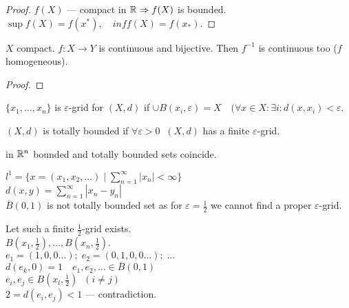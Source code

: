 \begin{proof}
  $f(X)$ --- compact in $\mathbb{R} \Rightarrow f(X)$ is bounded.\\
$\sup f(X) = f(x^{*}), \quad inf f(X) = f(x_{*})$.
\end{proof}

\begin{corollary}
  $X$ compact. $f:X \to Y$ is continuous and bijective. Then
  $f^{-1}$ is continuous too ($f$ homogeneous).
\end{corollary}

\begin{proof}

\end{proof}

\begin{definition}
 $\{x_1,\ldots,x_n\} $ is $\varepsilon$-grid for $(X,d)$ if $ \cup B(x_{i}, \varepsilon) = X \quad (\forall x\in X : \exists i :d(x,x_{i}) < \varepsilon$.
\end{definition}

\begin{definition}
  $(X,d)$ is totally bounded if $\forall \varepsilon>0 \;\; (X,d)$ has a finite $\varepsilon$-grid.
\end{definition}

\begin{example}
  in  $\mathbb{R}^{n}$ bounded and totally bounded sets coincide.
\end{example}

\begin{example}
  $l^{1} = \{x = (x_1, x_2, \ldots) \mid \sum_{n=1}^{\infty} \left| x_n \right| < \infty\} $ \\
  $d(x,y) = \sum_{n=1}^{\infty} \left| x_n - y_n \right|$ \\
  $\overline{B}(0,1)$ is not totally bounded set as for  $\varepsilon=\frac{1}{2}$ we cannot find a proper $\varepsilon$-grid.

  Let such a finite $\frac{1}{2}$-grid exists.\\
  $B(x_1, \frac{1}{2}), \ldots, B(x_n,\frac{1}{2})$.\\
$e_1=(1,0,0\ldots); \; e_2 = (0, 1, 0,0\ldots); \; \ldots$\\
$d(e_k,0) = 1 \quad e_1, e_2, \ldots \in  \overline{B}(0,1)$ \\
$e_i, e_j \in  B(x_l, \frac{1}{2}) \;\; (i \neq j)$ \\
$2 = d(e_i, e_j) < 1$ --- contradiction.
\end{example}

















